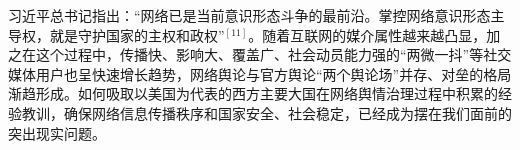 \documentclass[11pt,a4paper,utf8]{article}
\begin{document}
习近平总书记指出：“网络已是当前意识形态斗争的最前沿。掌控网络意识形态主导权，就是守护国家的主权和政权”$^{[11]}$。随着互联网的媒介属性越来越凸显，加之在这个过程中，传播快、影响大、覆盖广、社会动员能力强的“两微一抖”等社交媒体用户也呈快速增长趋势，网络舆论与官方舆论“两个舆论场”并存、对垒的格局渐趋形成。如何吸取以美国为代表的西方主要大国在网络舆情治理过程中积累的经验教训，确保网络信息传播秩序和国家安全、社会稳定，已经成为摆在我们面前的突出现实问题。\\
 
\end{document}

